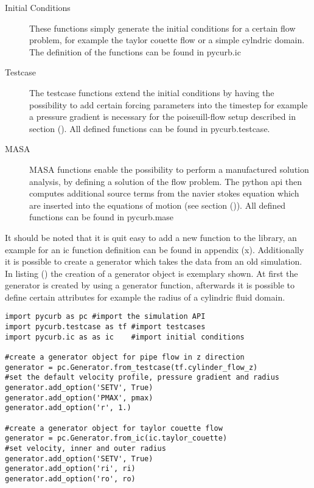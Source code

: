 \begin{description}
\item[Initial  Conditions] These functions simply generate the initial conditions for a certain flow problem, for example the taylor couette
                            flow or a simple cylndric domain. The definition of the functions can be found in pycurb.ic
\item[Testcase] The testcase functions extend the initial conditions by having the possibility to add certain forcing parameters into the timestep
                for example a pressure gradient is necessary for the poiseuill-flow setup described in section ().
                All defined functions can be found in pycurb.testcase.
\item[MASA]     MASA functions enable the possibility to perform a  manufactured solution analysis, by defining a solution of the flow problem.
                The python api then computes additional source terms from the navier stokes equation which are inserted into the equations of motion (see section ()).
                All defined functions can be found in pycurb.mase
\end{description}


It should be noted that it is quit easy to add a new function to the library, an example for an ic function definition can be found in appendix (x).
Additionally it is possible to create a generator which takes the data from an old simulation. In listing () the creation of a generator object is
exemplary shown. At first the generator is created by using a generator function, afterwards it is possible to define certain attributes
for example the radius of a cylindric fluid domain.\\

\begin{minipage}{\linewidth}
\begin{lstlisting}[caption='Generator class usage']
import pycurb as pc #import the simulation API
import pycurb.testcase as tf #import testcases
import pycurb.ic as as ic    #import initial conditions

#create a generator object for pipe flow in z direction
generator = pc.Generator.from_testcase(tf.cylinder_flow_z)
#set the default velocity profile, pressure gradient and radius
generator.add_option('SETV', True)
generator.add_option('PMAX', pmax)
generator.add_option('r', 1.)

#create a generator object for taylor couette flow
generator = pc.Generator.from_ic(ic.taylor_couette)
#set velocity, inner and outer radius
generator.add_option('SETV', True)
generator.add_option('ri', ri)
generator.add_option('ro', ro)
\end{lstlisting}
\end{minipage}

